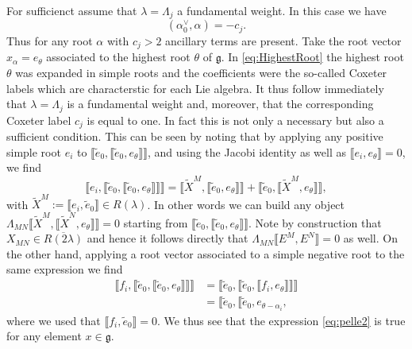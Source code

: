 For sufficienct assume that $\lambda=\Lambda_j$ a fundamental weight. In this case we have 
\begin{equation}
    (\alpha_0^\vee,\alpha) = -c_j.
\end{equation}
Thus for any root $\alpha$ with $c_j>2$ ancillary terms are present. Take the root vector $x_\alpha = e_\theta$ associated to the highest root $\theta$ of $\mathfrak{g}$. In \eqref{eq:HighestRoot} the highest root $\theta$ was expanded in simple roots and the coefficients were the so-called Coxeter labels which are characterstic for each Lie algebra. It thus follow immediately that $\lambda=\Lambda_j$ is a fundamental weight and, moreover, that the corresponding Coxeter label $c_j$ is equal to one. In fact this is not only a necessary but also a sufficient condition. This can be seen by noting that by applying any positive simple root $e_i$ to $\llbracket \tilde{e}_0,\llbracket\tilde{e}_0,e_\theta\rrbracket\rrbracket$, and using the Jacobi identity as well as $\llbracket e_i,e_\theta\rrbracket=0$, we find 
\begin{equation}\label{eq:pelle2}
    \llbracket e_i, \llbracket \tilde{e}_0,\llbracket\tilde{e}_0,e_\theta\rrbracket\rrbracket\rrbracket = \llbracket\tilde{X}^M,\llbracket\tilde{e}_0,e_\theta\rrbracket\rrbracket+\llbracket\tilde{e}_0,\llbracket\tilde{X}^M,e_\theta\rrbracket\rrbracket,
\end{equation}
with $\tilde{X}^M:=\llbracket e_i,\tilde{e}_0\rrbracket\in R(\lambda)$. In other words we can build any object $\Lambda_{MN}\llbracket \tilde{X}^M,\llbracket\tilde{X}^N,e_\theta\rrbracket\rrbracket=0$ starting from $\llbracket\tilde{e}_0,\llbracket\tilde{e}_0,e_\theta\rrbracket\rrbracket$. Note by construction that $X_{MN}\in \overbar{R(2\lambda)}$ and hence it follows directly that $\Lambda_{MN}\llbracket E^M,E^N\rrbracket=0$ as well. On the other hand, applying a root vector associated to a simple negative root to the same expression we find 
\begin{equation}
    \begin{aligned}
        \llbracket f_i,\llbracket \tilde{e}_0,\llbracket\tilde{e}_0,e_\theta\rrbracket\rrbracket\rrbracket &= \llbracket \tilde{e}_0,\llbracket\tilde{e}_0,\llbracket f_i,e_\theta\rrbracket\rrbracket\rrbracket\\
        &= \llbracket\tilde{e}_0,\llbracket\tilde{e}_0,e_{\theta-\alpha_i},
        \end{aligned}
\end{equation}
where we used that $\llbracket f_i,\tilde{e}_0\rrbracket=0$. We thus see that the expression \eqref{eq:pelle2} is true for any element $x\in\mathfrak{g}$. 

